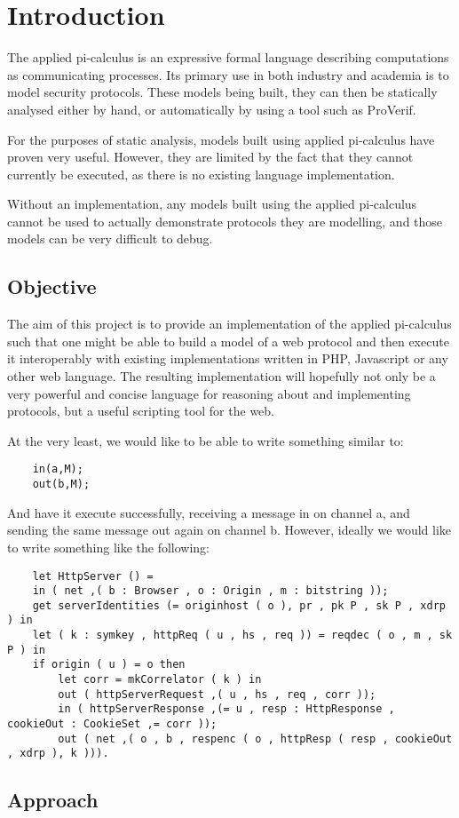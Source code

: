 \section{Introduction}

The applied pi-calculus is an expressive formal language describing computations as communicating processes. Its primary use in both industry and academia is to model security protocols. These models being built, they can then be statically analysed either by hand, or automatically by using a tool such as ProVerif. 

For the purposes of static analysis, models built using applied pi-calculus have proven very useful. However, they are limited by the fact that they cannot currently be executed, as there is no existing language implementation. 

Without an implementation, any models built using the applied pi-calculus cannot be used to actually demonstrate protocols they are modelling, and those models can be very difficult to debug.

\subsection{Objective}

The aim of this project is to provide an implementation of the applied pi-calculus such that one might be able to build a model of a web protocol and then execute it interoperably with existing implementations written in PHP, Javascript or any other web language. The resulting implementation will hopefully not only be a very powerful and concise language for reasoning about and implementing protocols, but a useful scripting tool for the web.

At the very least, we would like to be able to write something similar to:
    
\begin{verbatim}
    in(a,M); 
    out(b,M);
\end{verbatim}

And have it execute successfully, receiving a message in on channel a, and sending the same message out again on channel b. However, ideally we would like to write something like the following:

\begin{verbatim}
    let HttpServer () =
    in ( net ,( b : Browser , o : Origin , m : bitstring ));
    get serverIdentities (= originhost ( o ), pr , pk P , sk P , xdrp ) in
    let ( k : symkey , httpReq ( u , hs , req )) = reqdec ( o , m , sk P ) in
    if origin ( u ) = o then
        let corr = mkCorrelator ( k ) in
        out ( httpServerRequest ,( u , hs , req , corr ));
        in ( httpServerResponse ,(= u , resp : HttpResponse , cookieOut : CookieSet ,= corr ));
        out ( net ,( o , b , respenc ( o , httpResp ( resp , cookieOut , xdrp ), k ))).
\end{verbatim}
\subsection{Approach}


